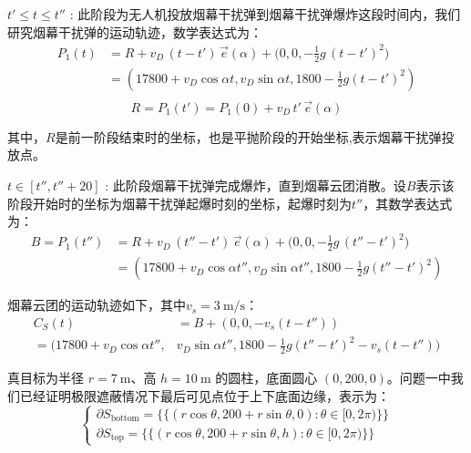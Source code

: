 \documentclass[withoutpreface,bwprint]{cumcmthesis}
\numberwithin{equation}{section} %
\numberwithin{figure}{section} %
\numberwithin{table}{section}  %
\newcommand*\circled[2]{\tikz[baseline=(char.base)]{\node[shape=circle,draw,inner sep=1.5pt] (char) {#1#2};}} %
\begin{document}
\vspace{0.5em} %
\circled{\large}{2} \textbf{$t'\le t\le t'' $} :
此阶段为无人机投放烟幕干扰弹到烟幕干扰弹爆炸这段时间内，我们研究烟幕干扰弹的运动轨迹，数学表达式为：
\begin{equation}
\begin{split}
     P_1(t) &= R+v_D\,(t-t')\,{\vec{e}}(\alpha)+\bigl(0,0,-\tfrac12 g\,(t-t')^2\bigr)\\
          &=(17800+v_D\cos{\alpha}t,v_D\sin{\alpha}t,1800-\frac{1}{2}g(t-t')^2)\\
\end{split}
\end{equation}
\begin{equation}
    R=P_1(t')=P_1(0)+v_D\,t'\,{\vec{e}}(\alpha)
\end{equation}

其中，$R$是前一阶段结束时的坐标，也是平抛阶段的开始坐标,表示烟幕干扰弹投放点。

\vspace{0.5em} %
\circled{\large}{3} \textbf{$t\in[t'',t''+20] $} :
此阶段烟幕干扰弹完成爆炸，直到烟幕云团消散。设$B$表示该阶段开始时的坐标为烟幕干扰弹起爆时刻的坐标，起爆时刻为$t''$，其数学表达式为：
\begin{equation}
\begin{split}
    B=P_1(t'')&=R+v_D\,(t''-t')\,{\vec{e}}(\alpha)+\bigl(0,0,-\tfrac12 g\,(t''-t')^2\bigr)\\
    &=(17800+v_D\cos{\alpha}t'',v_D\sin{\alpha}t'',1800-\frac{1}{2}g(t''-t')^2)
\end{split}
\end{equation}

烟幕云团的运动轨迹如下，其中$v_s=3\ \mathrm{m/s}$：
\begin{equation}
\begin{split}
    C_S(t) &= B + (0, 0, -v_s(t - t'')) \\ 
    = (17800 + v_D \cos \alpha t'',& v_D \sin \alpha t'', 1800 - \frac{1}{2}g(t'' - t')^2 - v_s(t - t''))
\end{split}
\end{equation}



真目标为半径 \(r=7\ \mathrm{m}\)、高 \(h=10\ \mathrm{m}\) 的圆柱，底面圆心 \((0,200,0)\)。问题一中我们已经证明极限遮蔽情况下最后可见点位于上下底面边缘，表示为：
\begin{equation}
    \begin{cases}
   \partial S_{\text{bottom}} = \{\{ (r \cos \theta, 200 + r \sin \theta, 0) : \theta \in [0, 2\pi) \}\} \\
   \partial S_{\text{top}} = \{\{ (r \cos \theta, 200 + r \sin \theta, h) : \theta \in [0, 2\pi) \}\}
\end{cases}
\end{equation}
\end{document}
